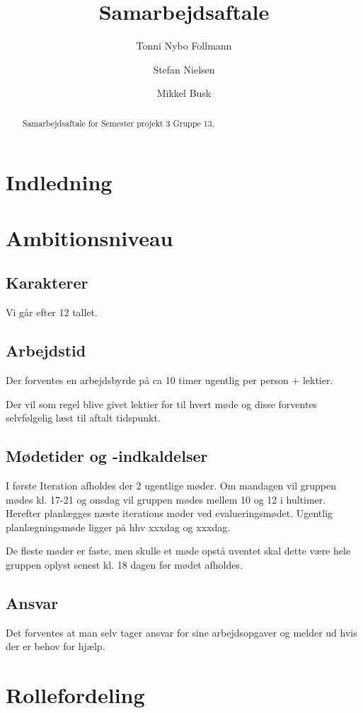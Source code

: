 \documentclass[a4paper,article,11pt,oneside]{memoir}
\title{Samarbejdsaftale}
\author{Tonni Nybo Follmann \and Stefan Nielsen \and Mikkel Busk}
\begin{document}
\maketitle

\begin{abstract}
Samarbejdsaftale for Semester projekt 3 Gruppe 13.
\end{abstract}


\frontmatter
\tableofcontents


\mainmatter
\chapter{Indledning}

\chapter{Ambitionsniveau}

\section{Karakterer}
Vi går efter 12 tallet.
\section{Arbejdstid}
Der forventes en arbejdsbyrde på ca 10 timer ugentlig per person + lektier.

Der vil som regel blive givet lektier for til hvert møde og disse forventes selvfølgelig læst til aftalt tidspunkt.
\section{Mødetider og -indkaldelser}
I første Iteration afholdes der 2 ugentlige møder. Om mandagen vil gruppen mødes kl. 17-21 og onsdag vil gruppen mødes mellem 10 og 12 i hultimer. Herefter planlægges næste iterations møder ved evalueringsmødet.
Ugentlig planlægningsmøde ligger på hhv xxxdag og xxxdag.

De fleste møder er faste, men skulle et møde opstå uventet skal dette være hele gruppen oplyst senest kl. 18 dagen før mødet afholdes.

\section{Ansvar}
Det forventes at man selv tager ansvar for sine arbejdsopgaver og melder ud hvis der er behov for hjælp.
\chapter{Rollefordeling}
\end{document}
